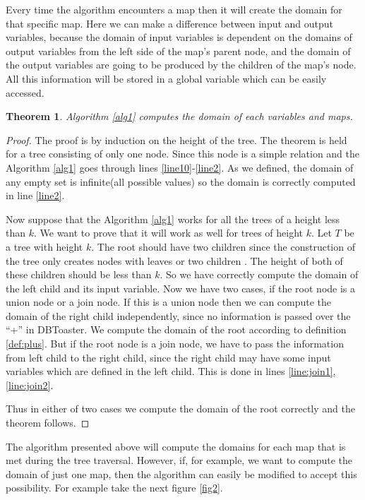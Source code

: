 \documentclass[12pt]{article}
\newtheorem{theorem}{Theorem}
\begin{document}
	Every time the algorithm encounters a map then it will create the domain for that specific map. Here we can make a difference between input and output variables, because the domain of input variables is dependent on the domains of output variables from the left side of the map's parent node, and the domain of the output variables are going to be produced by the children of the map's node. All this information will be stored in a global variable which can be easily accessed.
\begin{theorem}
Algorithm \ref{alg1} computes the domain of each variables and maps.
\end{theorem}

\begin{proof}
The proof is by induction on the height of the tree. The theorem is held for a tree consisting of only one node. Since this node is a simple relation and the Algorithm \ref{alg1} goes  through lines \ref{line10}-\ref{line2}. As we defined, the domain of any empty set is infinite(all possible values) so the domain is correctly computed in line \ref{line2}.

Now suppose that the Algorithm \ref{alg1} works for all the trees of a height less than $k$. We want to prove that it will work as well for trees of height $k$. Let $T$ be a tree with height $k$. The root should have two children since the construction of the tree only creates nodes with leaves or two children \cite{1}. The height of both of these children should be less than $k$. So we have correctly compute the domain of the left child and its input variable. Now we have two cases, if the root node is a union node or a join node. If this is a union node then we can compute the domain of the right child independently, since no information is passed over the ``+'' in DBToaster\cite{1}. We compute the domain of the root according to definition \eqref{def:plus}. But if the root node is a join node, we have to pass the information from left child to the right child, since the right child may have some input variables which are defined in the left child. This is done in lines \ref{line:join1},\ref{line:join2}.\par
Thus in either of two cases we compute the domain of the root correctly and the theorem follows.
\end{proof}

The algorithm presented above will compute the domains for each map that is met during the tree traversal. However, if, for example, we want to compute the domain of just one map, then the algorithm can easily be modified to accept this possibility. For example take the next figure \ref{fig2}.
\end{document}
